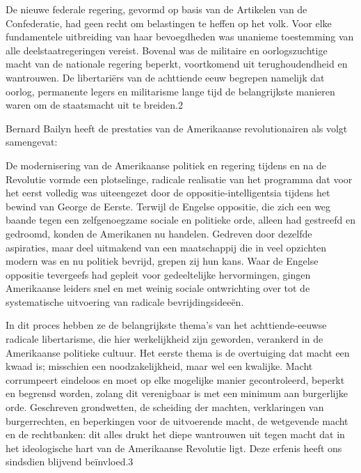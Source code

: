 \documentclass[
  a5paper,
  smalldemyvopaper,10pt,twoside,onecolumn,openright,extrafontsizes,hidelinks]{memoir}
\renewenvironment{quote}%
               {\list{}{\rightmargin=.6cm\leftmargin=.6cm}%
                \itshape \item[]}%
               {\endlist}
\begin{document}
De nieuwe federale regering, gevormd op basis van de Artikelen van de
Confederatie, had geen recht om belastingen te heffen op het volk. Voor
elke fundamentele uitbreiding van haar bevoegdheden was unanieme
toestemming van alle deelstaatregeringen vereist. Bovenal was de
militaire en oorlogszuchtige macht van de nationale regering beperkt,
voortkomend uit terughoudendheid en wantrouwen. De libertariërs van de
achttiende eeuw begrepen namelijk dat oorlog, permanente legers en
militarisme lange tijd de belangrijkste manieren waren om de staatsmacht
uit te breiden.2

Bernard Bailyn heeft de prestaties van de Amerikaanse revolutionairen
als volgt samengevat:

\begin{quote}
De modernisering van de Amerikaanse politiek en regering tijdens en na
de Revolutie vormde een plotselinge, radicale realisatie van het
programma dat voor het eerst volledig was uiteengezet door de
oppositie-intelligentsia tijdens het bewind van George de Eerste.
Terwijl de Engelse oppositie, die zich een weg baande tegen een
zelfgenoegzame sociale en politieke orde, alleen had gestreefd en
gedroomd, konden de Amerikanen nu handelen. Gedreven door dezelfde
aspiraties, maar deel uitmakend van een maatschappij die in veel
opzichten modern was en nu politiek bevrijd, grepen zij hun kans. Waar
de Engelse oppositie tevergeefs had gepleit voor gedeeltelijke
hervormingen, gingen Amerikaanse leiders snel en met weinig sociale
ontwrichting over tot de systematische uitvoering van radicale
bevrijdingsideeën.

In dit proces hebben ze de belangrijkste thema's van het
achttiende-eeuwse radicale libertarisme, die hier werkelijkheid zijn
geworden, verankerd in de Amerikaanse politieke cultuur. Het eerste
thema is de overtuiging dat macht een kwaad is; misschien een
noodzakelijkheid, maar wel een kwalijke. Macht corrumpeert eindeloos en
moet op elke mogelijke manier gecontroleerd, beperkt en begrensd worden,
zolang dit verenigbaar is met een minimum aan burgerlijke orde.
Geschreven grondwetten, de scheiding der machten, verklaringen van
burgerrechten, en beperkingen voor de uitvoerende macht, de wetgevende
macht en de rechtbanken: dit alles drukt het diepe wantrouwen uit tegen
macht dat in het ideologische hart van de Amerikaanse Revolutie ligt.
Deze erfenis heeft ons sindsdien blijvend beïnvloed.3
\end{quote}
\end{document}
